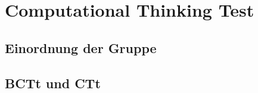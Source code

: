 \section{Computational Thinking Test}
	\subsection{Einordnung der Gruppe}
	
	\subsection{BCTt und CTt}